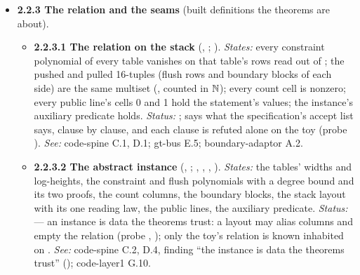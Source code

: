 \begin{itemize}[label={}, leftmargin=1.3em, itemindent=-1.3em, labelwidth=0pt, labelsep=0pt, itemsep=4pt, topsep=3pt]
\item {}\label{obl:node-2.2.3}\textbf{2.2.3 The relation and the seams} (built definitions the theorems are about).
\begin{itemize}[label={}, leftmargin=1.3em, itemindent=-1.3em, labelwidth=0pt, labelsep=0pt, itemsep=4pt, topsep=3pt]
\item {}\label{obl:node-2.2.3.1}\textbf{2.2.3.1 The relation on the stack} (, ; ). \emph{States:} every constraint polynomial of every table vanishes on that table's rows read out of ; the pushed and pulled 16-tuples (flush rows and boundary blocks of each side) are the same multiset (, counted in \ensuremath{\N}); every count cell is nonzero; every public line's cells 0 and 1 hold the statement's values; the instance's auxiliary predicate holds. \emph{Status:} ; says what the specification's accept list says, clause by clause, and each clause is refuted alone on the toy (probe ). \emph{See:} code-spine C.1, D.1; gt-bus E.5; boundary-adaptor A.2.
\item {}\label{obl:node-2.2.3.2}\textbf{2.2.3.2 The abstract instance} (, ; , , , ). \emph{States:} the tables' widths and log-heights, the constraint and flush polynomials with a degree bound  and its two proofs, the count columns, the boundary blocks, the stack layout with its one reading law, the public lines, the auxiliary predicate. \emph{Status:}   — an instance is data the theorems trust: a layout may alias columns and empty the relation (probe , ); only the toy's relation is known inhabited on . \emph{See:} code-spine C.2, D.4, finding ``the instance is data the theorems trust'' (); code-layer1 G.10.

\end{itemize}
\end{itemize}
